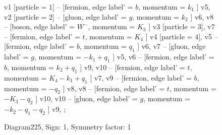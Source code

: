 \documentclass{revtex4}
\begin{document}
\begin{figure}[!htb]
\begin{center}
{    %
v1 [particle = \(1\)] -- [fermion, edge label' = \(b\), momentum = \(k_{1}\) ] v5, 
v2 [particle = \(2\)] -- [gluon, edge label' = \(g\), momentum = \(k_{2}\) ] v6, 
v8 -- [boson, edge label' = \(W^{-}\), momentum = \(K_{3}\) ] v3 [particle = \(3\)], 
v7 -- [fermion, edge label' = \(t\), momentum = \(K_{4}\) ] v4 [particle = \(4\)], 
v5 -- [fermion, edge label' = \(b\), momentum = \(q_{1}\) ] v6, 
v7 -- [gluon, edge label' = \(g\), momentum = \(-k_{1} + q_{1}\) ] v5, 
v6 -- [fermion, edge label' = \(b\), momentum = \(k_{2} + q_{1}\) ] v9, 
v10 -- [fermion, edge label' = \(t\), momentum = \(K_{4} - k_{1} + q_{1}\) ] v7, 
v9 -- [fermion, edge label' = \(b\), momentum = \(-q_{2}\) ] v8, 
v8 -- [fermion, edge label' = \(t\), momentum = \(-K_{3} - q_{2}\) ] v10, 
v10 -- [gluon, edge label' = \(g\), momentum = \(-k_{2} - q_{1} - q_{2}\) ] v9, 
};
\end{center}
\caption{Diagram225, Sign: 1, Symmetry factor: 1}
\end{figure}
\newpage
\end{document}
